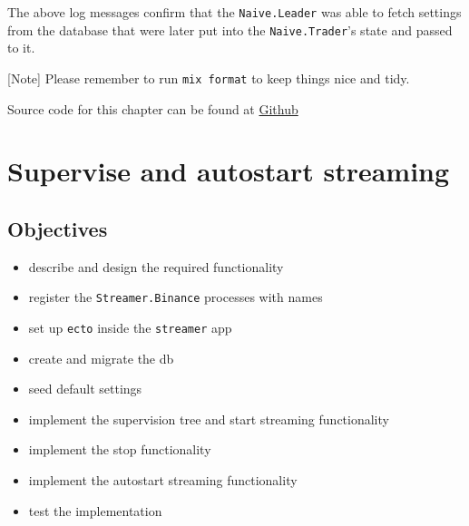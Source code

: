 \documentclass[
  oneside]{book}
\newenvironment{Shaded}{\begin{snugshade}}{\end{snugshade}}
\newcommand{\AttributeTok}[1]{\textcolor[rgb]{0.77,0.63,0.00}{#1}}
\newcommand{\CommentTok}[1]{\textcolor[rgb]{0.56,0.35,0.01}{\textit{#1}}}
\newcommand{\ControlFlowTok}[1]{\textcolor[rgb]{0.13,0.29,0.53}{\textbf{#1}}}
\newcommand{\ErrorTok}[1]{\textcolor[rgb]{0.64,0.00,0.00}{\textbf{#1}}}
\newcommand{\ExtensionTok}[1]{#1}
\newcommand{\KeywordTok}[1]{\textcolor[rgb]{0.13,0.29,0.53}{\textbf{#1}}}
\newcommand{\NormalTok}[1]{#1}
\newcommand{\OperatorTok}[1]{\textcolor[rgb]{0.81,0.36,0.00}{\textbf{#1}}}
\newcommand{\StringTok}[1]{\textcolor[rgb]{0.31,0.60,0.02}{#1}}
\providecommand{\tightlist}{%
  \setlength{\itemsep}{0pt}\setlength{\parskip}{0pt}}
\begin{document}
\begin{Shaded}
\end{Shaded}

The above log messages confirm that the \texttt{Naive.Leader} was able to fetch settings from the database that were later put into the \texttt{Naive.Trader}'s state and passed to it.

{[}Note{]} Please remember to run \texttt{mix\ format} to keep things nice and tidy.

Source code for this chapter can be found at \href{https://github.com/frathon/create-a-cryptocurrency-trading-bot-in-elixir-source-code/tree/chapter_10}{Github}

\hypertarget{supervise-and-autostart-streaming}{%
\chapter{Supervise and autostart streaming}\label{supervise-and-autostart-streaming}}

\hypertarget{objectives-10}{%
\section{Objectives}\label{objectives-10}}

\begin{itemize}
\tightlist
\item
  describe and design the required functionality
\item
  register the \texttt{Streamer.Binance} processes with names
\item
  set up \texttt{ecto} inside the \texttt{streamer} app
\item
  create and migrate the db
\item
  seed default settings
\item
  implement the supervision tree and start streaming functionality
\item
  implement the stop functionality
\item
  implement the autostart streaming functionality
\item
  test the implementation
\end{itemize}
\end{document}
